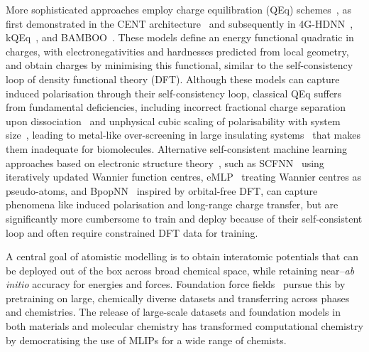 \documentclass[aps,%
superscriptaddress,
 amsmath,amssymb,
floatfix,
twocolumn
]{revtex4-2}
\begin{document}
More sophisticated approaches employ charge equilibration (QEq) schemes~\cite{qeq1985, qeq1986, Rappe1991ChargeSimulations}, as first demonstrated in the 
CENT architecture~\cite{cent2015, cent2017, cent2019} and subsequently in 4G-HDNN~\cite{4gnn_ko_2020}, kQEq~\cite{kqeq_og2022}, and BAMBOO~\cite{Gong2025}. These models define an energy functional quadratic in charges, with electronegativities and hardnesses predicted from local geometry, and obtain charges by minimising this functional, similar to the self-consistency loop of density functional theory (DFT). Although these models can capture induced polarisation through their self-consistency loop, classical QEq suffers from fundamental deficiencies, including incorrect fractional charge separation upon dissociation~\cite{Jensen2023UnifyingModels, Perdew1982Density-FunctionalEnergy, Vondrak2025PushingLimits} and unphysical cubic scaling of polarisability with system size~\cite{LeeWarren2008OriginMethods, nonlinear_pol_fq}, leading to metal-like over-screening in large insulating systems~\cite{conducting_molecules} that makes them inadequate for biomolecules. Alternative self-consistent machine learning approaches based on electronic structure theory~\cite{Thomas2025}, such as SCFNN~\cite{scfnn} using iteratively updated Wannier function centres, eMLP~\cite{eMLP} treating Wannier centres as pseudo-atoms, and BpopNN~\cite{bpopnn} inspired by orbital-free DFT, can capture phenomena like induced polarisation and long-range charge transfer, but are significantly more cumbersome to train and deploy because of their self-consistent loop and often require constrained DFT data for training.

A central goal of atomistic modelling is to obtain interatomic potentials that can be deployed out of the box across broad chemical space, while retaining near--\textit{ab initio} accuracy for energies and forces. Foundation force fields~\cite{batatia2024foundationmodelatomisticmaterials, Deng2023, wood2025umafamilyuniversalmodels} pursue this by pretraining on large, chemically diverse datasets and transferring across phases and chemistries.  The release of large-scale datasets and foundation models in both materials and molecular chemistry has transformed computational chemistry by democratising the use of MLIPs for a wide range of chemists.
\end{document}
